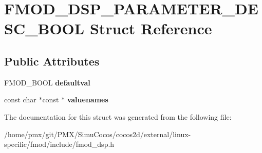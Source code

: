 \hypertarget{structFMOD__DSP__PARAMETER__DESC__BOOL}{}\section{F\+M\+O\+D\+\_\+\+D\+S\+P\+\_\+\+P\+A\+R\+A\+M\+E\+T\+E\+R\+\_\+\+D\+E\+S\+C\+\_\+\+B\+O\+OL Struct Reference}
\label{structFMOD__DSP__PARAMETER__DESC__BOOL}
\subsection*{Public Attributes}
\begin{DoxyCompactItemize}
\item 
\mbox{\label{structFMOD__DSP__PARAMETER__DESC__BOOL_a20622323e1938e829be8d2a45743f7b2}} 
F\+M\+O\+D\+\_\+\+B\+O\+OL {\bfseries defaultval}
\item 
\mbox{\label{structFMOD__DSP__PARAMETER__DESC__BOOL_aa58432b4a207191d40783a27a618084b}} 
const char $\ast$const  $\ast$ {\bfseries valuenames}
\end{DoxyCompactItemize}


The documentation for this struct was generated from the following file\+:\begin{DoxyCompactItemize}
\item 
/home/pmx/git/\+P\+M\+X/\+Simu\+Cocos/cocos2d/external/linux-\/specific/fmod/include/fmod\+\_\+dsp.\+h\end{DoxyCompactItemize}
